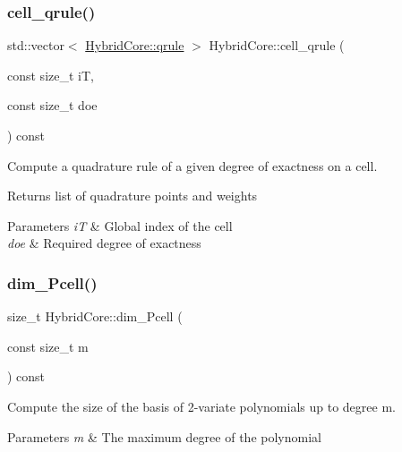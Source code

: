 \subsubsection{\texorpdfstring{cell\+\_\+qrule()}{cell\_qrule()}}
{\footnotesize\ttfamily std\+::vector$<$ \hyperlink{structHArDCore2D_1_1HybridCore_1_1qrule}{Hybrid\+Core\+::qrule} $>$ Hybrid\+Core\+::cell\+\_\+qrule (\begin{DoxyParamCaption}\item[{const size\+\_\+t}]{iT,  }\item[{const size\+\_\+t}]{doe }\end{DoxyParamCaption}) const}



Compute a quadrature rule of a given degree of exactness on a cell. 

\begin{DoxyReturn}{Returns}
list of quadrature points and weights 
\end{DoxyReturn}

\begin{DoxyParams}{Parameters}
{\em iT} & Global index of the cell \\
\hline
{\em doe} & Required degree of exactness \\
\hline
\end{DoxyParams}
\mbox{\label{classHArDCore2D_1_1HybridCore_aa2bdc59d150566e1b992058031509d2f}} 
\subsubsection{\texorpdfstring{dim\+\_\+\+Pcell()}{dim\_Pcell()}}
{\footnotesize\ttfamily size\+\_\+t Hybrid\+Core\+::dim\+\_\+\+Pcell (\begin{DoxyParamCaption}\item[{const size\+\_\+t}]{m }\end{DoxyParamCaption}) const}



Compute the size of the basis of 2-\/variate polynomials up to degree m. 


\begin{DoxyParams}{Parameters}
{\em m} & The maximum degree of the polynomial \\
\hline
\end{DoxyParams}
\mbox{\label{classHArDCore2D_1_1HybridCore_ab0fb57313f27fb8b4a6e9747de1d5cfe}} 
